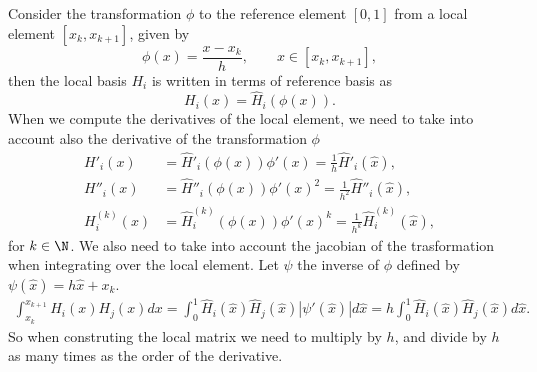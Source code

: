 \documentclass[]{report}
\begin{document}
    \begin{center}
    \end{center}
    Consider the transformation $\phi$ to the reference element $[0,1]$ from a local element $[x_k, x_{k+1}]$, given by
    \begin{equation*}
        \phi(x) = \frac{x-x_k}{h}, \qquad x \in [x_k,x_{k+1}],
    \end{equation*}
    then the local basis $H_i$ is written in terms of reference basis as
    \begin{equation*}
        H_i(x) = \hat{H}_i(\phi(x)).
    \end{equation*}
    When we compute the derivatives of the local element, we need to take into account also the derivative of the transformation $\phi$
    \begin{align*}
        H'_i(x) &= \hat{H}'_i(\phi(x)) \phi'(x) = \frac{1}{h} \hat{H}'_i(\hat{x}), \\
        H''_i(x) &= \hat{H}''_i(\phi(x)) \phi'(x)^2 = \frac{1}{h^2} \hat{H}''_i(\hat{x}), \\
        H^{(k)}_i(x) &= \hat{H}^{(k)}_i(\phi(x)) \phi'(x)^k = \frac{1}{h^k}\hat{H}^{(k)}_i(\hat{x}),
    \end{align*}
    for $k \in \N$. We also need to take into account the jacobian of the trasformation when integrating over the local element. Let $\psi$ the inverse of $\phi$ defined by $\psi(\hat{x}) = h \hat{x} + x_k$. 
    \begin{align*}
        \int_{x_k}^{x_{k+1}} H_i(x)H_j(x)dx = \int_0^1 \hat{H}_i(\hat{x}) \hat{H}_j(\hat{x}) |\psi'(\hat{x})| d\hat{x} = h \int_0^1 \hat{H}_i(\hat{x}) \hat{H}_j(\hat{x}) d\hat{x}.
    \end{align*}
    {\color{red} So when construting the local matrix we need to multiply by $h$, and divide by $h$ as many times as the order of the derivative.}
\end{document}
